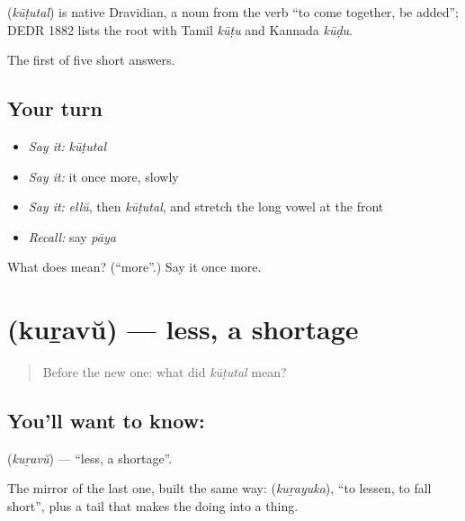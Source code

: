 \begin{cousinweb}
\textbf{} (\emph{kūṭutal}) is native Dravidian, a noun from the verb \textquotedblleft{}to come together, be added\textquotedblright{}; DEDR 1882 lists the root with Tamil \emph{kūṭu} and Kannada \emph{kūḍu}.
\end{cousinweb}

\begin{grammarlens}[title={What you've built}]
The first of five short answers.
\end{grammarlens}

\subsection*{Your turn}
\begin{itemize}
\raggedright
  \item \emph{Say it:} \emph{kūṭutal}
  \item \emph{Say it:} it once more, slowly
  \item \emph{Say it:} \emph{ellŭ}, then \emph{kūṭutal}, and stretch the long vowel at the front
  \item \emph{Recall:} say \emph{pāya}
\end{itemize}

\begin{tcolorbox}[breakable,colback=teal!4,colframe=teal!35!black,title={Before you move on}]
What does  mean? (\textquotedblleft{}more\textquotedblright{}.) Say it once more.
\end{tcolorbox}
\section[\texorpdfstring{\ml{കുറവ്} (kuṟavŭ)}{കുറവ് (kuṟavŭ)}]{ (kuṟavŭ) — less, a shortage}

\label{lesson:ML-C58-less}



\begin{quote}
Before the new one: what did \emph{kūṭutal} mean?
\end{quote}

\subsection*{You'll want to know: }
\textbf{} (\emph{kuṟavŭ}) — \textquotedblleft{}less, a shortage\textquotedblright{}.

The mirror of the last one, built the same way:  (\emph{kuṟayuka}), \textquotedblleft{}to lessen, to fall short\textquotedblright{}, plus a tail that makes the doing into a thing.

